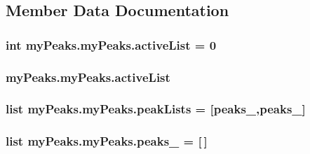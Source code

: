 \subsection{Member Data Documentation}
\hypertarget{classmy_peaks_1_1my_peaks_ae28250cdc31d2022b52ebd0b35b61ad9}{
\subsubsection[{active\-List}]{\setlength{\rightskip}{0pt plus 5cm}int my\-Peaks.\-my\-Peaks.\-active\-List = 0\hspace{0.3cm}{\ttfamily [static]}}}\label{classmy_peaks_1_1my_peaks_ae28250cdc31d2022b52ebd0b35b61ad9}
\hypertarget{classmy_peaks_1_1my_peaks_ab764afe03c88786678b9b63fa09337ef}{
\subsubsection[{active\-List}]{\setlength{\rightskip}{0pt plus 5cm}my\-Peaks.\-my\-Peaks.\-active\-List}}\label{classmy_peaks_1_1my_peaks_ab764afe03c88786678b9b63fa09337ef}
\hypertarget{classmy_peaks_1_1my_peaks_a769d8400c803069ed2de73079e5e8b08}{
\subsubsection[{peak\-Lists}]{\setlength{\rightskip}{0pt plus 5cm}list my\-Peaks.\-my\-Peaks.\-peak\-Lists = \mbox{[}{\bf peaks\-\_},{\bf peaks\-\_}\mbox{]}\hspace{0.3cm}{\ttfamily [static]}}}\label{classmy_peaks_1_1my_peaks_a769d8400c803069ed2de73079e5e8b08}
\hypertarget{classmy_peaks_1_1my_peaks_a188582bdcbbda828a9d44fd7336570d8}{
\subsubsection[{peaks\-\_\-0}]{\setlength{\rightskip}{0pt plus 5cm}list my\-Peaks.\-my\-Peaks.\-peaks\-\_ = \mbox{[}$\,$\mbox{]}\hspace{0.3cm}{\ttfamily [static]}}}\label{classmy_peaks_1_1my_peaks_a188582bdcbbda828a9d44fd7336570d8}
